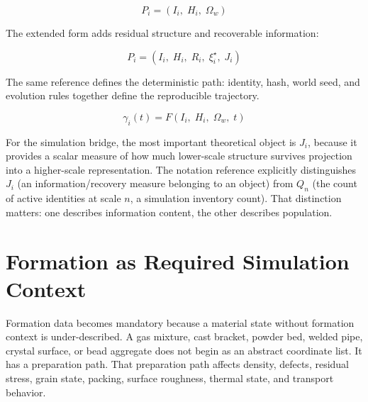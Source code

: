 \documentclass[11pt,a4paper]{article}
\begin{document}
\begin{eqbox}
\[P_i = (I_i,\; H_i,\; \Omega_w)\]
\end{eqbox}

The extended form adds residual structure and recoverable information:

\begin{eqbox}
\[P_i = (I_i,\; H_i,\; R_i,\; \xi_i^{\star},\; J_i)\]
\end{eqbox}

The same reference defines the deterministic path: identity, hash, world seed, and evolution
rules together define the reproducible trajectory.

\begin{eqbox}
\[\gamma_i(t) = F(I_i,\; H_i,\; \Omega_w,\; t)\]
\end{eqbox}

For the simulation bridge, the most important theoretical object is $J_i$, because it provides
a scalar measure of how much lower-scale structure survives projection into a higher-scale
representation. The notation reference explicitly distinguishes $J_i$ (an information/recovery
measure belonging to an object) from $Q_n$ (the count of active identities at scale $n$, a
simulation inventory count). That distinction matters: one describes information content, the
other describes population.

\section{Formation as Required Simulation Context}

Formation data becomes mandatory because a material state without formation context is
under-described. A gas mixture, cast bracket, powder bed, welded pipe, crystal surface, or
bead aggregate does not begin as an abstract coordinate list. It has a preparation path. That
preparation path affects density, defects, residual stress, grain state, packing, surface
roughness, thermal state, and transport behavior.
\end{document}
